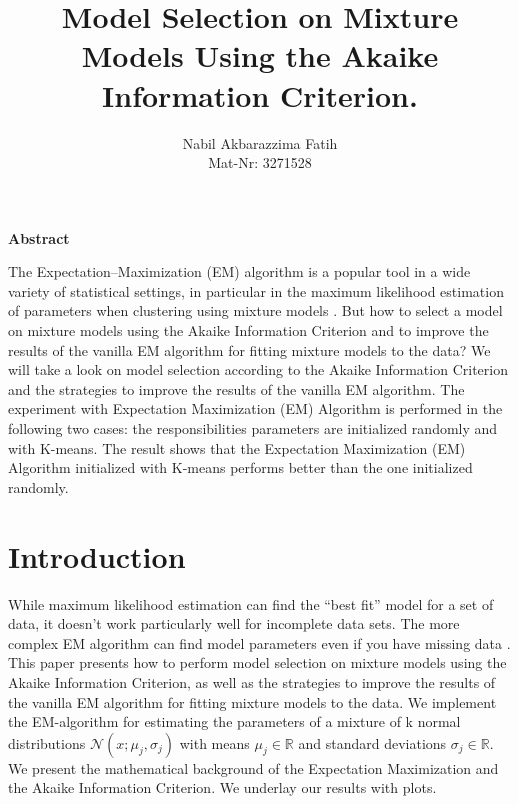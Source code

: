 \documentclass[abstract=true]{scrartcl}
\author{
	Nabil Akbarazzima Fatih \\
	Mat-Nr: 3271528
}
\date{}
\title{Model Selection on Mixture Models Using the Akaike Information Criterion.}
\begin{document}
\maketitle
\vspace{5px}
\begin{center}
\Large
\textbf{Abstract}
\end{center}
The Expectation–Maximization (EM) algorithm is a popular tool in a wide variety of statistical settings, in particular in the maximum likelihood estimation of parameters when clustering using mixture models \cite{OHAGAN20123843}. But how to select a model on mixture models using the Akaike Information Criterion and to improve the results of the vanilla EM algorithm for fitting mixture models to the data? We will take a look on model selection according to the Akaike Information Criterion and the strategies to improve the results of the vanilla EM algorithm. The experiment with Expectation Maximization (EM) Algorithm is performed in the following two cases: the responsibilities parameters are initialized randomly and with K-means. The result shows that the Expectation Maximization (EM) Algorithm initialized with K-means performs better than the one initialized randomly.

\vspace{10px}
\section{Introduction}

While maximum likelihood estimation can find the “best fit” model for a set of data, it doesn’t work particularly well for incomplete data sets. The more complex EM algorithm can find model parameters even if you have missing data \cite{stephanie}.
This paper presents how to perform model selection on mixture models using the Akaike Information Criterion, as well as the strategies to improve the results of the vanilla EM algorithm for fitting mixture models to the data.
We implement the EM-algorithm for estimating the parameters of a mixture of k normal distributions $ \mathcal{N}(x;\mu_j,\sigma_j) $ with means $ \mu_j \in \mathbb{R}$  and standard deviations $ \sigma_j \in \mathbb{R} $.
We present the mathematical background of the Expectation Maximization and the Akaike Information Criterion. We underlay our results with plots.
\vspace{10px}
\end{document}
